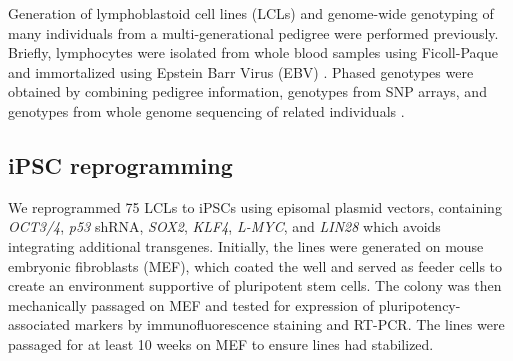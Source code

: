 \documentclass{article}
\begin{document}
Generation of lymphoblastoid cell lines (LCLs) and genome-wide genotyping of
many individuals from a multi-generational pedigree were performed
previously. Briefly, lymphocytes were isolated from whole blood samples using Ficoll-Paque and immortalized using Epstein Barr Virus (EBV) \cite{Cusanovich2012,
Cusanovich2016}. Phased genotypes were obtained by combining pedigree
information, genotypes from SNP arrays, and genotypes from whole genome
sequencing of related individuals \cite{Livne2015}.

\subsection*{iPSC reprogramming} 

We reprogrammed 75 LCLs to iPSCs using episomal plasmid vectors, containing \emph{OCT3/4}, \emph{p53} shRNA, \emph{SOX2}, \emph{KLF4}, \emph{L-MYC}, and \emph{LIN28} which avoids integrating additional transgenes\cite{Okita2011}. 
Initially, the lines were generated on mouse embryonic fibroblasts (MEF), which coated the well and served as feeder cells to create an environment supportive of pluripotent stem cells.  
The colony was then mechanically passaged on MEF and tested for expression of pluripotency-associated markers by immunofluorescence staining and RT-PCR. 
The lines were passaged for at least 10 weeks on MEF to ensure lines had stabilized. 
\end{document}
